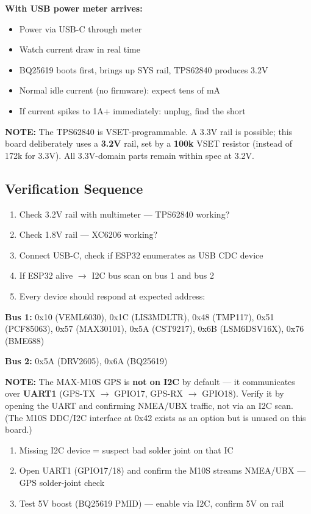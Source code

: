 \documentclass[11pt,a4paper]{article}
\newcommand{\notebox}[1]{\par\noindent\colorbox{headerblue!8}{\parbox{\dimexpr\textwidth-2\fboxsep}{%
\textcolor{headerblue}{\textbf{NOTE:}} #1}}\par\vspace{0.5em}}
\begin{document}
\textbf{With USB power meter arrives:}
\begin{itemize}[nosep]
\item Power via USB-C through meter
\item Watch current draw in real time
\item BQ25619 boots first, brings up SYS rail, TPS62840 produces 3.2V
\item Normal idle current (no firmware): expect tens of mA
\item If current spikes to 1A+ immediately: unplug, find the short
\end{itemize}

\notebox{The TPS62840 is VSET-programmable. A 3.3V rail is possible; this board deliberately uses a \textbf{3.2V} rail, set by a \textbf{100k} VSET resistor (instead of 172k for 3.3V). All 3.3V-domain parts remain within spec at 3.2V.}

\subsection*{Verification Sequence}

\begin{enumerate}[nosep]
\item Check 3.2V rail with multimeter — TPS62840 working?
\item Check 1.8V rail — XC6206 working?
\item Connect USB-C, check if ESP32 enumerates as USB CDC device
\item If ESP32 alive $\rightarrow$ I2C bus scan on bus 1 and bus 2
\item Every device should respond at expected address:
\end{enumerate}

\textbf{Bus 1:} 0x10 (VEML6030), 0x1C (LIS3MDLTR), 0x48 (TMP117), 0x51 (PCF85063), 0x57 (MAX30101), 0x5A (CST9217), 0x6B (LSM6DSV16X), 0x76 (BME688)

\textbf{Bus 2:} 0x5A (DRV2605), 0x6A (BQ25619)

\notebox{The MAX-M10S GPS is \textbf{not on I2C} by default — it communicates over \textbf{UART1} (GPS-TX $\rightarrow$ GPIO17, GPS-RX $\rightarrow$ GPIO18). Verify it by opening the UART and confirming NMEA/UBX traffic, not via an I2C scan. (The M10S DDC/I2C interface at 0x42 exists as an option but is unused on this board.)}

\begin{enumerate}[nosep,start=6]
\item Missing I2C device = suspect bad solder joint on that IC
\item Open UART1 (GPIO17/18) and confirm the M10S streams NMEA/UBX — GPS solder-joint check
\item Test 5V boost (BQ25619 PMID) — enable via I2C, confirm 5V on rail
\end{enumerate}
\end{document}
